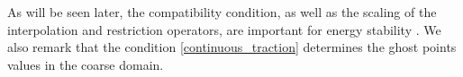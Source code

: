 {{ As will be seen later, the compatibility condition, as well as the scaling of the interpolation and restriction operators, are important for energy stability \cite{Lundquist2018}. 
  We also remark that the condition \eqref{continuous_traction} determines the ghost points values in the coarse domain. 

}}
